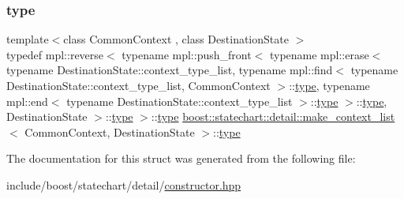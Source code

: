 \subsubsection{\texorpdfstring{type}{type}}
{\footnotesize\ttfamily template$<$class Common\+Context , class Destination\+State $>$ \\
typedef mpl\+::reverse$<$ typename mpl\+::push\+\_\+front$<$ typename mpl\+::erase$<$ typename Destination\+State\+::context\+\_\+type\+\_\+list, typename mpl\+::find$<$ typename Destination\+State\+::context\+\_\+type\+\_\+list, Common\+Context $>$\+::\mbox{\hyperlink{structboost_1_1statechart_1_1detail_1_1make__context__list_a2874fb24dd80c6537533d389755d7a7b}{type}}, typename mpl\+::end$<$ typename Destination\+State\+::context\+\_\+type\+\_\+list $>$\+::\mbox{\hyperlink{structboost_1_1statechart_1_1detail_1_1make__context__list_a2874fb24dd80c6537533d389755d7a7b}{type}} $>$\+::\mbox{\hyperlink{structboost_1_1statechart_1_1detail_1_1make__context__list_a2874fb24dd80c6537533d389755d7a7b}{type}}, Destination\+State $>$\+::\mbox{\hyperlink{structboost_1_1statechart_1_1detail_1_1make__context__list_a2874fb24dd80c6537533d389755d7a7b}{type}} $>$\+::\mbox{\hyperlink{structboost_1_1statechart_1_1detail_1_1make__context__list_a2874fb24dd80c6537533d389755d7a7b}{type}} \mbox{\hyperlink{structboost_1_1statechart_1_1detail_1_1make__context__list}{boost\+::statechart\+::detail\+::make\+\_\+context\+\_\+list}}$<$ Common\+Context, Destination\+State $>$\+::\mbox{\hyperlink{structboost_1_1statechart_1_1detail_1_1make__context__list_a2874fb24dd80c6537533d389755d7a7b}{type}}}



The documentation for this struct was generated from the following file\+:\begin{DoxyCompactItemize}
\item 
include/boost/statechart/detail/\mbox{\hyperlink{constructor_8hpp}{constructor.\+hpp}}\end{DoxyCompactItemize}
